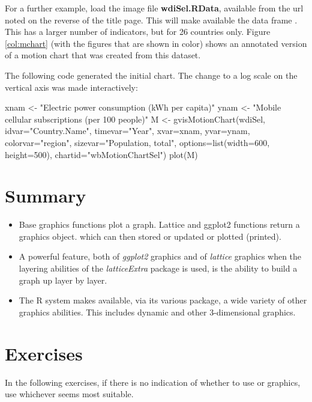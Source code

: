 For a further example, load the image file {\bf wdiSel.RData},
available from the url noted on the reverse of the title page. This
will make available the data frame . This has a larger
number of indicators, but for 26 countries only.  Figure
\ref{col:mchart} (with the figures that are shown in color) shows an
annotated version of a motion chart that was created from this
dataset.

The following code generated the initial chart.  The change
to a log scale on the vertical axis was made interactively:
\begin{fullwidth}
\begin{Schunk}
\begin{Sinput}
xnam <- "Electric power consumption (kWh per capita)"
ynam <- "Mobile cellular subscriptions (per 100 people)"
M <- gvisMotionChart(wdiSel, idvar="Country.Name", timevar="Year",
                     xvar=xnam, yvar=ynam,
                     colorvar="region", sizevar="Population, total",
                     options=list(width=600, height=500),
                     chartid="wbMotionChartSel")
plot(M)
\end{Sinput}
\end{Schunk}
\end{fullwidth}


\section{Summary}
\begin{itemize}
\item[] Base graphics functions plot a graph.  Lattice and ggplot2
functions return a graphics object. which can then stored or updated
or plotted (printed).

\item[] A powerful feature, both of \textit{ggplot2} graphics and of
  \textit{lattice} graphics when the layering abilities of the
  \textit{latticeExtra} package is used, is the ability to build a
  graph up layer by layer.

\item[] The R system makes available, via its various package,
a wide variety of other graphics abilities.  This includes
dynamic and other 3-dimensional graphics.
\end{itemize}


\section{Exercises}\label{sec:plot}
In the following exercises, if there is no indication of whether to
use  or  graphics, use whichever seems
most suitable.


